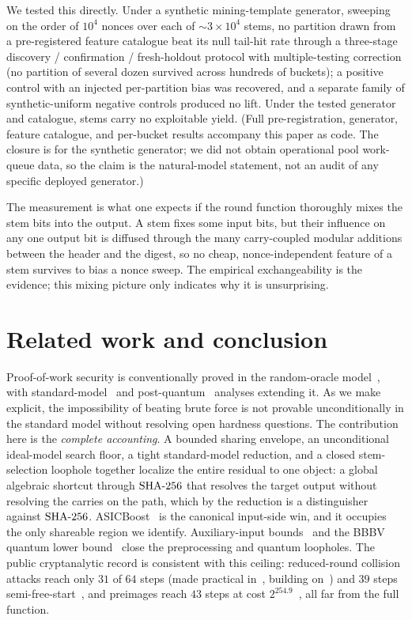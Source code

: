 \documentclass[11pt]{article}
\begin{document}
We tested this directly. Under a synthetic mining-template generator,
sweeping on the order of $10^{4}$ nonces over each of $\sim\!3\times10^{4}$
stems, no partition drawn from a pre-registered feature catalogue beat its
null tail-hit rate through a three-stage discovery / confirmation /
fresh-holdout protocol with multiple-testing correction (no partition of
several dozen survived across hundreds of buckets); a positive control
with an injected per-partition bias was recovered, and a separate family of
synthetic-uniform negative controls produced no lift. Under the tested generator and
catalogue, stems carry no exploitable yield. (Full pre-registration,
generator, feature catalogue, and per-bucket results accompany this
paper as code. The closure is for the synthetic generator; we did not
obtain operational pool work-queue data, so the claim is the natural-model
statement, not an audit of any specific deployed generator.)

The measurement is what one expects if the round function thoroughly mixes
the stem bits into the output. A stem fixes some input bits, but their
influence on any one output bit is diffused through the many carry-coupled
modular additions between the header and the digest, so no cheap,
nonce-independent feature of a stem survives to bias a nonce sweep. The
empirical exchangeability is the evidence; this mixing picture only
indicates why it is unsurprising.

\section{Related work and conclusion}\label{sec:related}

Proof-of-work security is conventionally proved in the random-oracle
model~\cite{backbone}, with standard-model~\cite{gkp} and
post-quantum~\cite{pqbackbone,hybrid} analyses extending it. As we make
explicit, the impossibility of beating brute force is not provable
unconditionally in the standard model without resolving open hardness
questions. The contribution here is the \emph{complete accounting}. A
bounded sharing envelope, an unconditional ideal-model search floor, a
tight standard-model reduction, and a closed stem-selection loophole
together localize the entire residual to one object: a global algebraic
shortcut through $\mathrm{SHA\text{-}256}$ that resolves the target output without resolving
the carries on the path, which by the reduction is a distinguisher against
$\mathrm{SHA\text{-}256}$. ASICBoost~\cite{asicboost} is the canonical
input-side win, and it occupies the only shareable region we identify.
Auxiliary-input bounds~\cite{cdgs,cdg,unruh,dgk} and the BBBV quantum lower
bound~\cite{bbbv} close the preprocessing and quantum loopholes. The public
cryptanalytic record is consistent with this ceiling: reduced-round
collision attacks reach only $31$ of $64$ steps (made practical
in~\cite{lll24}, building on~\cite{mendel13}) and $39$ steps
semi-free-start~\cite{lll24}, and preimages reach $43$ steps at cost
$2^{254.9}$~\cite{aoki09}, all far from the full function.
\end{document}
